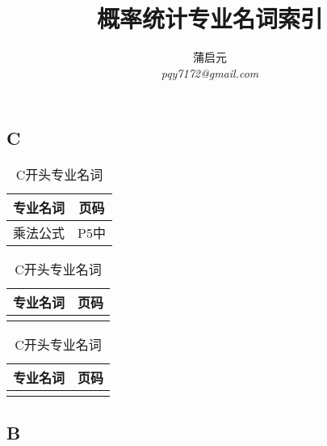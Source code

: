 \documentclass{wx672article}
\title{概率统计专业名词索引}
\author{蒲启元 \\
 \emph{pqy7172@gmail.com}}
\begin{document}
\maketitle{}



\begin{center}
  \section*{C}
\end{center}
\label{sec:c}


 \begin{table}[h!] %
      \centering
        \begin{tabular}[t]{c|c} %
          \hline
          专业名词 &  页码   \\
          \hline
          乘法公式 & P5中 \\
          \hline
        \end{tabular}
        \hfill
        \begin{tabular}[t]{c|c}
          \hline
          专业名词  &  页码  \\
          \hline
           &  \\
          \hline
        \end{tabular}
        \hfill
        \begin{tabular}[t]{c|c}
          \hline
          专业名词 &  页码 \\
          \hline
           &  \\
          \hline
        \end{tabular}
        \caption{C开头专业名词}\label{tabC}
      \end{table}


      \begin{center}
        \section*{B}
      \end{center}
      \label{sec:b}
\end{document}
